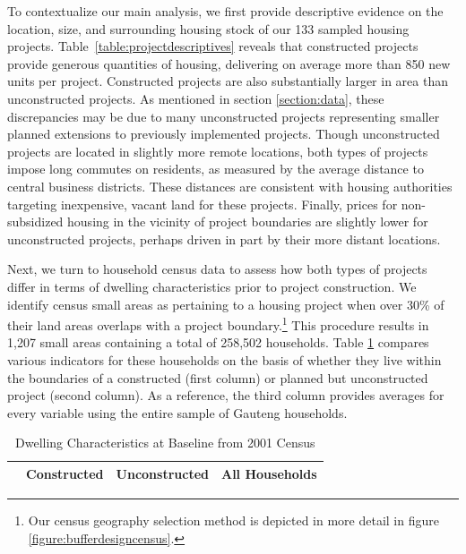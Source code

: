 \documentclass[12pt]{article}
\begin{document}
To contextualize our main analysis, we first provide descriptive evidence on the location, size, and surrounding housing stock of our 133 sampled housing projects. Table~\ref{table:projectdescriptives} reveals that constructed projects provide generous quantities of housing, delivering on average more than 850 new units per project. Constructed projects are also substantially larger in area than unconstructed projects. As mentioned in section \ref{section:data}, these discrepancies may be due to many unconstructed projects representing smaller planned extensions to previously implemented projects. Though unconstructed projects are located in slightly more remote locations, both types of projects impose long commutes on residents, as measured by the average distance to central business districts. These distances are consistent with housing authorities targeting inexpensive, vacant land for these projects. Finally, prices for non-subsidized housing in the vicinity of project boundaries are slightly lower for unconstructed projects, perhaps driven in part by their more distant locations.

Next, we turn to household census data to assess how both types of projects differ in terms of dwelling characteristics prior to project construction. We identify census small areas as pertaining to a housing project when over 30\% of their land areas overlaps with a project boundary.\footnote{Our census geography selection method is depicted in more detail in figure \ref{figure:bufferdesigncensus}.} This procedure results in 1,207 small areas containing a total of 258,502 households. Table \ref{table:projectdescriptivescensus} compares various indicators for these households on the basis of whether they live within the boundaries of a constructed (first column) or planned but unconstructed project (second column). As a reference, the third column provides averages for every variable using the entire sample of Gauteng households. 

\begin{table}[t!]
	\centering
	\caption{Dwelling Characteristics at Baseline from 2001 Census}\label{table:projectdescriptivescensus}
\vspace{-2mm}
\begin{tabular}{l*{1}{ccc}}
\toprule
& Constructed & Unconstructed & All Households \\
\midrule
 
\bottomrule
\end{tabular}
\end{table}
\end{document}
